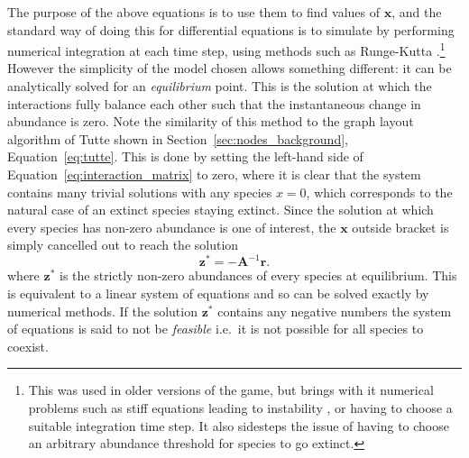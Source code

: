 The purpose of the above equations is to use them to find values of $\mathbf{x}$, and the standard way of doing this for differential equations is to simulate by performing numerical integration at each time step, using methods such as Runge-Kutta \cite{Press2007Runge}.\footnote{This was used in older versions of the game, but brings with it numerical problems such as stiff equations leading to instability \cite{Press2007Runge}, or having to choose a suitable integration time step. It also sidesteps the issue of having to choose an arbitrary abundance threshold for species to go extinct.}
However the simplicity of the model chosen allows something different: it can be analytically solved for an \emph{equilibrium} point. This is the solution at which the interactions fully balance each other such that the instantaneous change in abundance is zero. Note the similarity of this method to the graph layout algorithm of Tutte shown in Section~\ref{sec:nodes_background}, Equation~\eqref{eq:tutte}.
This is done by setting the left-hand side of Equation~\eqref{eq:interaction_matrix} to zero, where it is clear that the system contains many trivial solutions with any species $x=0$, which corresponds to the natural case of an extinct species staying extinct.
Since the solution at which every species has non-zero abundance is one of interest, the $\mathbf{x}$ outside bracket is simply cancelled out to reach the solution
\begin{equation}
  \mathbf{z^*} = -\mathbf{A}^{-1}\mathbf{r}.
  \label{eq:equilibrium}
\end{equation}
where $\mathbf{z}^*$ is the strictly non-zero abundances of every species at equilibrium.
This is equivalent to a linear system of equations and so can be solved exactly by numerical methods.
If the solution $\mathbf{z^*}$ contains any negative numbers the system of equations is said to not be \emph{feasible} i.e.\ it is not possible for all species to coexist.

